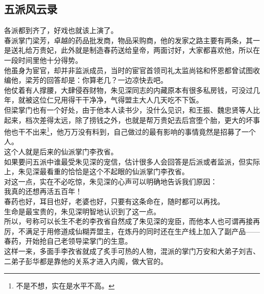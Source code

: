 \begin{multicols}{\theparacolNo}
\subsection{五派风云录}
各派都到齐了，好戏也就该上演了。\\

春派掌门梁芳，卓越的药品批发商，物品采购商，他的发家之路主要有两条，其一是送礼给万贵妃，此外就是制造春药送给皇帝，两面讨好，大家都喜欢他，所以在一段时间里他十分得势。\\

他虽身为宦官，却并非监派成员，当时的宦官首领司礼太监尚铭和怀恩都曾试图收编他，梁芳的回答却是：你算老几？一边凉快去吧。\\

他仗着有人撑腰，大肆侵吞财物，朱见深同志的内藏原本有很多私房钱，可没过几年，就被这位仁兄用得干干净净，气得盟主大人几天吃不下饭。\\

但梁掌门也有一个好处，由于他本人读书少，没什么见识，和王振、魏忠贤等人比起来，档次差得太远，除了捞钱之外，也就是帮万贵妃去后宫堕个胎，更大的坏事他也干不出来\footnote{不是不想，实在是水平不高。}，他万万没有料到，自己做过的最有影响的事情竟然是招募了一个人。\\

这个人就是后来的仙派掌门李孜省。\\

如果要问五派中谁最受朱见深的宠信，估计很多人会回答是后派或者监派，但实际上，朱见深最看重的恰恰是这个不起眼的仙派掌门李孜省。\\

对这一点，实在不必吃惊，朱见深的心声可以明确地告诉我们原因：\\

我真的还想再活五百年！\\

春药也好，耳目也好，老婆也好，只要有这条命在，随时都可以再找。\\

生命是最宝贵的，朱见深明智地认识到了这一点。\\

所以，号称可以长生不老的李孜省自然成了朱见深的宠臣，而他本人也可谓再接再厉，不满足于用修道成仙糊弄盟主，在炼丹的同时还在生产线上加入了副产品——春药，开始抢自己老领导梁掌门的生意。\\

这样一来，多面手李孜省就成了炙手可热的人物，混派的掌门万安和大弟子刘吉、二弟子彭华都是靠他的关系才进入内阁，做大官的。\\


\end{multicols}

